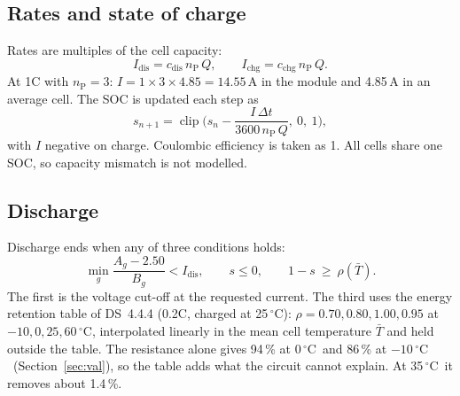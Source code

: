 \documentclass[11pt,a4paper]{article}
\newcommand{\ds}[1]{\textsc{DS}~#1}
\newcommand{\degC}{\ensuremath{{}^{\circ}\mathrm{C}}}
\newcommand{\nP}{n_{\mathrm{P}}}
\begin{document}
\subsection{Rates and state of charge}
Rates are multiples of the cell capacity:
\begin{equation}
I_{\mathrm{dis}}=c_{\mathrm{dis}}\,\nP\,Q,\qquad I_{\mathrm{chg}}=c_{\mathrm{chg}}\,\nP\,Q .
\end{equation}
At 1C with $\nP=3$: $I=1\times3\times4.85=14.55$\,A in the module and 4.85\,A in an average cell. The SOC is updated each step as
\begin{equation}
s_{n+1}=\operatorname{clip}\!\Big(s_n-\frac{I\,\Delta t}{3600\,\nP\,Q},\ 0,\ 1\Big),
\end{equation}
with $I$ negative on charge. Coulombic efficiency is taken as 1. All cells share one SOC, so capacity mismatch is not modelled.

\subsection{Discharge}
Discharge ends when any of three conditions holds:
\begin{equation}
\min_g\frac{A_g-2.50}{B_g}<I_{\mathrm{dis}},\qquad s\le0,\qquad 1-s\ \ge\ \rho(\bar T).
\end{equation}
The first is the voltage cut-off at the requested current. The third uses the energy retention table of \ds{4.4.4} (0.2C, charged at 25\,\degC): $\rho=0.70,0.80,1.00,0.95$ at $-10,0,25,60$\,\degC, interpolated linearly in the mean cell temperature $\bar T$ and held outside the table. The resistance alone gives 94\,\% at 0\,\degC\ and 86\,\% at $-10$\,\degC\ (Section~\ref{sec:val}), so the table adds what the circuit cannot explain. At 35\,\degC\ it removes about 1.4\,\%.
\end{document}
